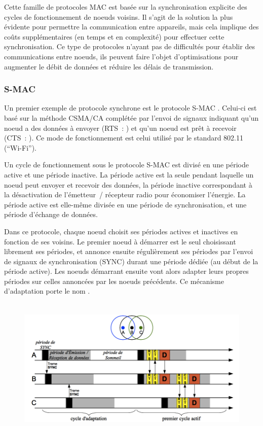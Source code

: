 Cette famille de protocoles MAC est basée sur la synchronisation explicite
des cycles de fonctionnement de noeuds voisins. Il s'agit de la solution
la plus évidente pour permettre la communication entre appareils, mais
cela implique des coûts supplémentaires (en temps et en complexité)
pour effectuer cette synchronisation. Ce type de protocoles n'ayant
pas de difficultés pour établir des communications entre noeuds,
ils peuvent faire l'objet d'optimisations pour augmenter le débit
de données et réduire les délais de transmission.

\subsubsection{S-MAC}
\label{ParSMAC}

Un premier exemple de protocole synchrone est le protocole S-MAC \cite{SMAC}.
Celui-ci est basé sur la méthode CSMA/CA complétée par l'envoi de signaux
indiquant qu'un noeud a des données à envoyer (RTS~: )
et qu'un noeud est prêt à recevoir (CTS~: ). Ce mode
de fonctionnement est celui utilisé par le standard 802.11 (``Wi-Fi'').

Un cycle de fonctionnement sous le protocole S-MAC est divisé en une
période active et une période inactive. La période active est la seule
pendant laquelle un noeud peut envoyer et recevoir des données, la période
inactive correspondant à la désactivation de l'émetteur~/ récepteur radio
pour économiser l'énergie. La période active est elle-même divisée en
une période de synchronisation, et une période d'échange de données.

Dans ce protocole, chaque noeud choisit ses périodes actives et inactives
en fonction de ses voisins. Le premier noeud à démarrer est le seul
choisissant librement ses périodes, et annonce ensuite régulièrement
ses périodes par l'envoi de signaux de synchronisation (SYNC) durant
une période dédiée (au début de la période active). Les noeuds démarrant
ensuite vont alors adapter leurs propres périodes sur celles annoncées
par les noeuds précédents. Ce mécanisme d'adaptation porte le nom
.

\begin{figure}[!hbt]
\centering
\includegraphics[height=6.75cm]{images/ch3-s-mac.png}
\label{FigSMACadapt}
\end{figure}


